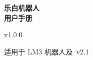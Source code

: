 \begin{titlepage}
    \centering

    {\sffamily\bfseries 乐白机器人\\[1em]用户手册}

    \vspace{2em}

    {\sf v1.0.0}

    \vfill

    {适用于 LM3 机器人及\LM~v2.1}
\end{titlepage}